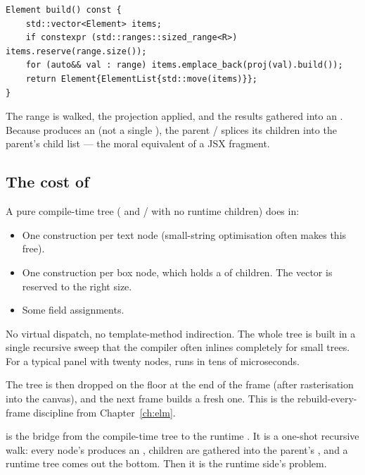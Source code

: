 \begin{lstlisting}
Element build() const {
    std::vector<Element> items;
    if constexpr (std::ranges::sized_range<R>) items.reserve(range.size());
    for (auto&& val : range) items.emplace_back(proj(val).build());
    return Element{ElementList{std::move(items)}};
}
\end{lstlisting}

The range is walked, the projection applied, and the results
gathered into an . Because  produces
an  (not a single ), the parent
/ splices its children into the parent's child list
--- the moral equivalent of a JSX fragment.

\subsection{The cost of }

A pure compile-time tree ( and /
with no runtime children) does  in:

\begin{itemize}[leftmargin=*]
  \item One  construction per text node
    (small-string optimisation often makes this free).
  \item One  construction per box node, which holds
    a  of children. The vector is
    reserved to the right size.
  \item Some  field assignments.
\end{itemize}

No virtual dispatch, no template-method indirection. The whole tree
is built in a single recursive sweep that the compiler often inlines
completely for small trees. For a typical panel with twenty nodes,
 runs in tens of microseconds.

The  tree is then dropped on the floor at the end of
the frame (after rasterisation into the canvas), and the next frame
builds a fresh one. This is the rebuild-every-frame discipline from
Chapter~\ref{ch:elm}.

\begin{recap}
 is the bridge from the compile-time tree to the
runtime . It is a one-shot recursive walk: every
node's  produces an , children are
gathered into the parent's , and a runtime tree comes
out the bottom. Then it is the runtime side's problem.
\end{recap}


